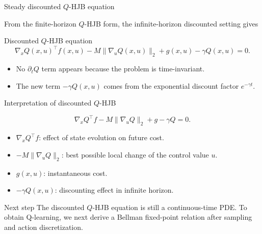 \documentclass[aspectratio=169]{beamer}
\begin{document}
\begin{frame}{Steady discounted \(Q\)-HJB equation}

From the finite-horizon \(Q\)-HJB form, the infinite-horizon discounted setting gives


\begin{block}{Discounted \(Q\)-HJB equation}
\[
\boxed{
\nabla_x Q(x,u)^\top f(x,u)
-
M\|\nabla_u Q(x,u)\|_2
+
g(x,u)
-
\gamma Q(x,u)
=
0.
}
\]
\end{block}

\vspace{0.1cm}

\begin{itemize}
    \item No \(\partial_t Q\) term appears because the problem is time-invariant.
    \vspace{0.15cm}
    \item The new term \(-\gamma Q(x,u)\) comes from the exponential discount factor \(e^{-\gamma t}\).
\end{itemize}

\end{frame}


\begin{frame}{Interpretation of discounted \(Q\)-HJB}

\[
\nabla_x Q^\top f
-
M\|\nabla_u Q\|_2
+
g
-
\gamma Q
=
0.
\]

\vspace{0.25cm}

\begin{itemize}
    \item \(\nabla_xQ^\top f\): effect of state evolution on future cost.
    \vspace{0.25cm}

    \item \(-M\|\nabla_uQ\|_2\): best possible local change of the control value \(u\).
    \vspace{0.25cm}

    \item \(g(x,u)\): instantaneous cost.
    \vspace{0.25cm}

    \item \(-\gamma Q(x,u)\): discounting effect in infinite horizon.
\end{itemize}

\vspace{0.15cm}

\begin{alertblock}{Next step}
\small
The discounted \(Q\)-HJB equation is still a continuous-time PDE.
To obtain Q-learning, we next derive a Bellman fixed-point relation after sampling and action discretization.
\end{alertblock}

\end{frame}
\end{document}
